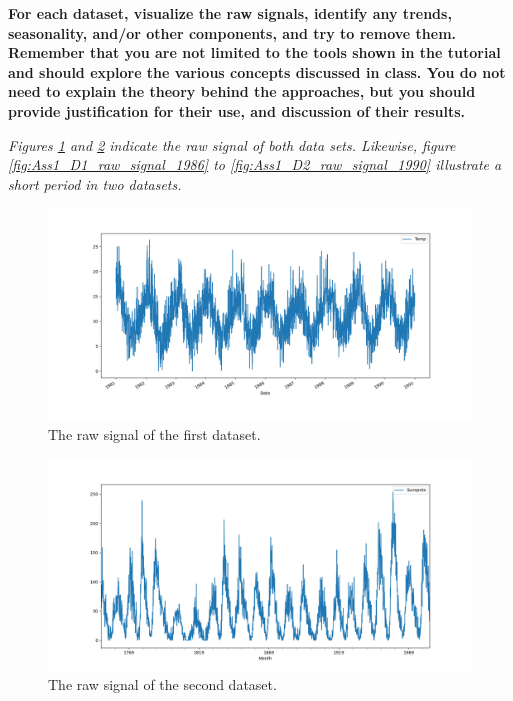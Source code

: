 \item \textbf{For each dataset, visualize the raw signals, identify any trends, seasonality, and/or other components, and try to remove them. Remember that you are not limited to the tools shown in the tutorial and should explore the various concepts discussed in class. You do not need to explain the theory behind the approaches, but you should provide justification for their use, and discussion of their results.}


\textit{Figures \ref{fig:Ass1_D1_raw_signal} and \ref{fig:Ass1_D2_raw_signal} indicate the raw signal of both data sets. Likewise, figure \ref{fig:Ass1_D1_raw_signal_1986} to  \ref{fig:Ass1_D2_raw_signal_1990} illustrate a short period in two datasets. }

\begin{figure}[H]
    \centering
    \begin{minipage}[b]{1\textwidth}
        \includegraphics[width=\textwidth]{figures/Ass1/Ass1_D1_raw_signal.png}
    \end{minipage}
    \caption{The raw signal of the first dataset.}
    \label{fig:Ass1_D1_raw_signal}
\end{figure}

\begin{figure}[H]
    \centering
    \begin{minipage}[b]{1\textwidth}
        \includegraphics[width=\textwidth]{figures/Ass1/Ass1_D2_raw_signal.png}
    \end{minipage}
    \caption{The raw signal of the second dataset.}
    \label{fig:Ass1_D2_raw_signal}
\end{figure}

